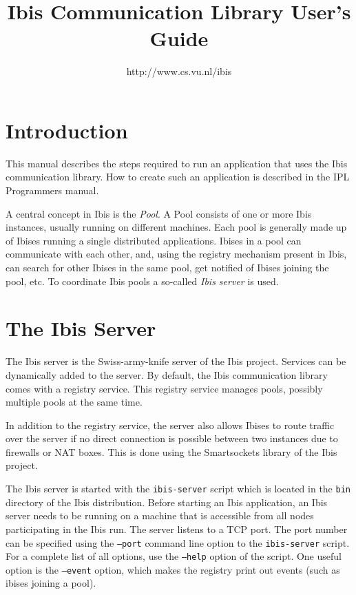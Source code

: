 \documentclass[10pt]{article}
\begin{document}
\title{Ibis Communication Library User's Guide}

\author{http://www.cs.vu.nl/ibis}

\maketitle

\section{Introduction}

This manual describes the steps required to run an application that 
uses the Ibis communication library. How to create such an application
is described in the IPL Programmers manual.

A central concept in Ibis is the \emph{Pool}. A Pool consists of one or
more Ibis instances, usually running on different machines. Each pool is
generally made up of Ibises running a single distributed applications.
Ibises in a pool can communicate with each other, and, using the
registry mechanism present in Ibis, can search for other Ibises in the
same pool, get notified of Ibises joining the pool, etc. To
coordinate Ibis pools a so-called \emph{Ibis server} is used.

\section{The Ibis Server}

The Ibis server is the Swiss-army-knife server of the Ibis project.
Services can be dynamically added to the server. By default, the Ibis
communication library comes with a registry service. This registry
service manages pools, possibly multiple pools at the same time.  

In addition to the registry service, the server also allows
Ibises to route traffic over the server if no direct connection is
possible between two instances due to firewalls or NAT boxes. This is
done using the Smartsockets library of the Ibis project.

The Ibis server is started with the \texttt{ibis-server} script which is
located in the \texttt{bin} directory of the Ibis distribution.  Before
starting an Ibis application, an Ibis server needs to be running on a
machine that is accessible from all nodes participating in the Ibis run.
The server listens to a TCP port. The port number can be specified using
the \texttt{--port} command line option to the \texttt{ibis-server}
script.  For a complete list of all options, use the \texttt{--help}
option of the script. One useful option is the  \texttt{--event}
option, which makes the registry print out events (such as ibises
joining a pool).
\end{document}
